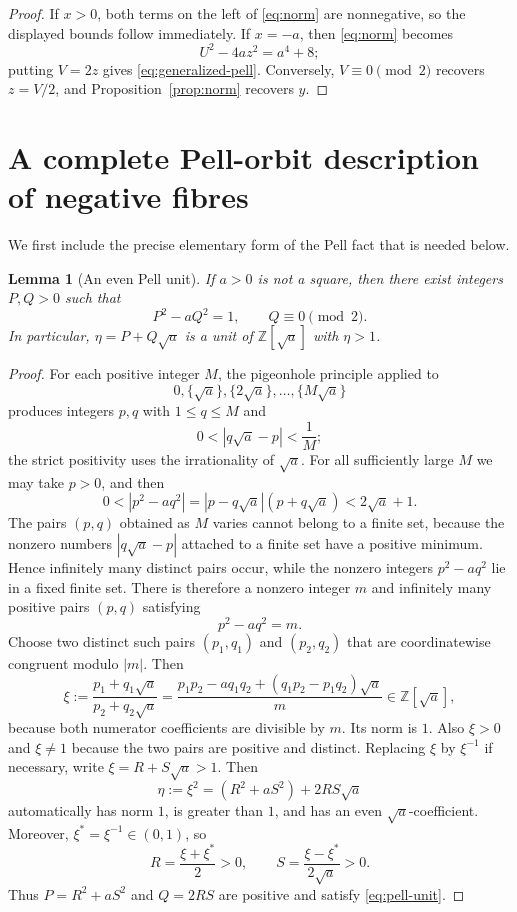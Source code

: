 \documentclass[11pt]{article}
\newtheorem{lemma}[theorem]{Lemma}
\theoremstyle{remark}
\newcommand{\Z}{\mathbb Z}
\begin{document}
\begin{proof}
If $x>0$, both terms on the left of \eqref{eq:norm} are nonnegative, so the displayed bounds follow immediately.  If $x=-a$, then \eqref{eq:norm} becomes
\[
 U^2-4az^2=a^4+8;
\]
putting $V=2z$ gives \eqref{eq:generalized-pell}.  Conversely, $V\equiv0\pmod2$ recovers $z=V/2$, and Proposition~\ref{prop:norm} recovers $y$.
\end{proof}

\section{A complete Pell-orbit description of negative fibres}

We first include the precise elementary form of the Pell fact that is needed below.

\begin{lemma}[An even Pell unit]\label{lem:pell-unit}
If $a>0$ is not a square, then there exist integers $P,Q>0$ such that
\begin{equation}\label{eq:pell-unit}
 P^2-aQ^2=1,
 \qquad Q\equiv0\pmod2.
\end{equation}
In particular, $\eta=P+Q\sqrt a$ is a unit of $\Z[\sqrt a]$ with $\eta>1$.
\end{lemma}

\begin{proof}
For each positive integer $M$, the pigeonhole principle applied to
\[
 0,\{\sqrt a\},\{2\sqrt a\},\ldots,\{M\sqrt a\}
\]
produces integers $p,q$ with $1\le q\le M$ and
\[
 0<|q\sqrt a-p|<\frac1M;
\]
the strict positivity uses the irrationality of $\sqrt a$.  For all sufficiently large $M$ we may take $p>0$, and then
\[
 0<|p^2-aq^2|
 =|p-q\sqrt a|(p+q\sqrt a)
 <2\sqrt a+1.
\]
The pairs $(p,q)$ obtained as $M$ varies cannot belong to a finite set, because the nonzero numbers $|q\sqrt a-p|$ attached to a finite set have a positive minimum.  Hence infinitely many distinct pairs occur, while the nonzero integers $p^2-aq^2$ lie in a fixed finite set.  There is therefore a nonzero integer $m$ and infinitely many positive pairs $(p,q)$ satisfying
\[
 p^2-aq^2=m.
\]
Choose two distinct such pairs $(p_1,q_1)$ and $(p_2,q_2)$ that are coordinatewise congruent modulo $|m|$.  Then
\[
 \xi:=\frac{p_1+q_1\sqrt a}{p_2+q_2\sqrt a}
 =\frac{p_1p_2-aq_1q_2+(q_1p_2-p_1q_2)\sqrt a}{m}
 \in\Z[\sqrt a],
\]
because both numerator coefficients are divisible by $m$.  Its norm is $1$.  Also $\xi>0$ and $\xi\ne1$ because the two pairs are positive and distinct.  Replacing $\xi$ by $\xi^{-1}$ if necessary, write $\xi=R+S\sqrt a>1$.  Then
\[
 \eta:=\xi^2=(R^2+aS^2)+2RS\sqrt a
\]
automatically has norm $1$, is greater than $1$, and has an even $\sqrt a$-coefficient.  Moreover, $\xi^*=\xi^{-1}\in(0,1)$, so
\[
 R=\frac{\xi+\xi^*}{2}>0,\qquad
 S=\frac{\xi-\xi^*}{2\sqrt a}>0.
\]
Thus $P=R^2+aS^2$ and $Q=2RS$ are positive and satisfy \eqref{eq:pell-unit}.
\end{proof}
\end{document}
